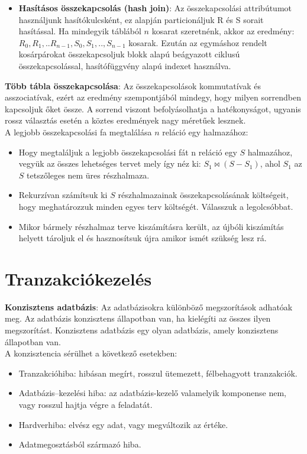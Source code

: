 \documentclass[margin=0px]{article}
\begin{document}
\begin{itemize}
		\item	\textbf{Hasításos összekapcsolás (hash join)}: Az összekapcsolási attribútumot használjunk hasítókulcsként, ez alapján
		particionáljuk R és S sorait hasítással. Ha mindegyik táblából $n$ kosarat szeretnénk, akkor az eredmény: $R_{0},R_{1},..R_{n-1}, S_{0},S_{1},..,S_{n-1}$ kosarak. Ezután az egymáshoz rendelt kosárpárokat összekapcsoljuk blokk alapú beágyazott ciklusú
		összekapcsolással, hasítófüggvény alapú indexet használva.
	\end{itemize}
	
	\noindent \textbf{Több tábla összekapcsolása}: Az összekapcsolások kommutatívak és asszociatívak, ezért az eredmény szempontjából
	mindegy, hogy milyen sorrendben kapcsoljuk őket össze. A sorrend viszont befolyásolhatja a hatékonyságot, ugyanis rossz választás
	esetén a köztes eredmények nagy méretűek lesznek.\\
	
	\noindent A legjobb összekapcsolási fa megtalálása $n$ reláció egy halmazához:
	\begin{itemize}
		\item	Hogy megtaláljuk a legjobb összekapcsolási fát n reláció egy $S$ halmazához,
		vegyük az összes lehetséges tervet mely így néz ki: $S_{1} \Join (S - S_{1})$, ahol $S_{1}$ az $S$ tetszőleges nem üres részhalmaza.
		
		\item	Rekurzívan számítsuk ki $S$ részhalmazainak összekapcsolásának költségeit, hogy meghatározzuk minden egyes terv költségét. Válasszuk a legolcsóbbat.
		
		\item	Mikor bármely részhalmaz terve kiszámításra került, az újbóli kiszámítás helyett tároljuk el és hasznosítsuk újra amikor ismét szükség lesz rá.
	\end{itemize}
	
	\section{Tranzakciókezelés}
	
	\noindent \textbf{Konzisztens adatbázis}: Az adatbázisokra különböző megszorítások adhatóak meg. Az adatbázis konzisztens állapotban
	van, ha kielégíti az összes ilyen megszorítást. Konzisztens adatbázis egy olyan adatbázis, amely konzisztens állapotban van.\\
	
	\noindent A konzisztencia sérülhet a következő esetekben:
	\begin{itemize}
		\item	Tranzakcióhiba: hibásan megírt, rosszul ütemezett, félbehagyott tranzakciók.
		\item	Adatbázis--kezelési hiba: az adatbázis-kezelő valamelyik komponense nem, vagy rosszul hajtja végre a feladatát.
		\item	Hardverhiba: elvész egy adat, vagy megváltozik az értéke.
		\item	Adatmegosztásból származó hiba.
	\end{itemize}
	
\end{document}
